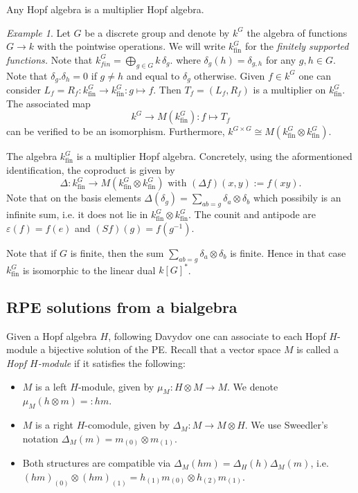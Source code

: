 \documentclass[a4paper,10pt]{amsart}
\theoremstyle{definition}
\theoremstyle{remark}
\newtheorem{example}[lemma]{Example}
\newcommand{\fin}{\operatorname{fin}}
\newcommand\D{\Delta}
\newcommand\eps{\varepsilon}
\newcommand\ot{\otimes}
\begin{document}
Any Hopf algebra is a multiplier Hopf algebra.

\begin{example}\label{finite support functions}
Let $G$ be a discrete group and denote by $k^G$ the algebra of functions $G \rightarrow k$ with the pointwise operations. We will write $k^{G}_{\fin}$ for the \emph{finitely supported functions.} Note that $k^{G}_{fin} = \bigoplus_{g\in G} k \, \delta_g.$ where $\delta_g(h) = \delta_{g,h}$ for any $g,h \in G.$ Note that $\delta_g . \delta_h = 0$ if $g\neq h$ and equal to $\delta_g$ otherwise. Given $f \in k^G$ one can consider $L_f = R_f : k^{G}_{\fin} \rightarrow k^{G}_{\fin}: g \mapsto f.$ Then $T_f = (L_f,R_f)$ is a multiplier on $k^{G}_{\fin}$. The associated map 
$$k^G \rightarrow M(k^{G}_{\fin}): f \mapsto T_f$$
can be verified to be an isomorphism. Furthermore, $k^{G\times G} \cong M(k^{G}_{\fin} \ot k^{G}_{\fin}).$

The algebra $k^{G}_{\fin}$ is a multiplier Hopf algebra. Concretely, using the aformentioned identification, the coproduct is given by
$$
\D : k^{G}_{\fin} \to M(k^{G}_{\fin} \ot k^{G}_{\fin})
\text{ with } (\D f)(x,y) := f(xy).
$$
Note that on the basis elements $\D (\delta_g) = \sum_{ab=g} \delta_a \ot \delta_b$ which possibily is an infinite sum, i.e. it does not lie in $k^{G}_{\fin} \ot k^{G}_{\fin}$. The counit and antipode are $\eps(f) = f(e)$ and $(Sf)(g) = f(g^{-1})$.

Note that if $G$ is finite, then the sum $\sum_{ab=g} \delta_a \otimes \delta_b$ is finite. Hence in that case $k^G_{\fin}$ is isomorphic to the linear dual $k[G]^*$.
\end{example}


\subsection{RPE solutions from a bialgebra}\label{subsection sol from hopf}
Given a Hopf algebra $H$, following Davydov \cite[Section 3]{Dav} one can associate to each Hopf $H$-module a bijective solution of the PE. Recall that a vector space $M$ is called a \emph{Hopf $H$-module} if it satisfies the following:
\begin{itemize}
    \item $M$ is a left $H$-module, given by $\mu_M: H \ot M \rightarrow M$. We denote $\mu_M(h\ot m)= : hm$.
    \item $M$ is a right $H$-comodule, given by $\D_M: M \rightarrow M \ot H$. We use Sweedler's notation $\D_M(m) = m_{(0)} \ot m_{(1)}$.
    \item Both structures are compatible via $\D_M(hm) = \D_H(h)\D_M(m)$, i.e. $(hm)_{(0)} \ot (hm)_{(1)} = h_{(1)}m_{(0)} \ot h_{(2)} m_{(1)}.$ 
\end{itemize}
\end{document}
